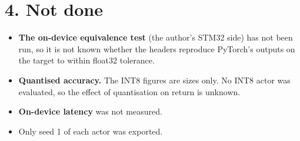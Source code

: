 \documentclass[11pt]{article}
\begin{document}
\section*{4. Not done}



\begin{itemize}
\item \textbf{The on-device equivalence test} (the author's STM32 side) has not been run, so it is not known whether the headers reproduce PyTorch's outputs on the target to within float32 tolerance.
\item \textbf{Quantised accuracy.} The INT8 figures are sizes only. No INT8 actor was evaluated, so the effect of quantisation on return is unknown.
\item \textbf{On-device latency} was not measured.
\item Only seed 1 of each actor was exported.
\end{itemize}
\end{document}
